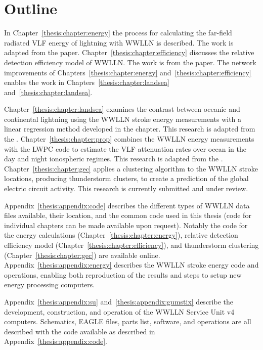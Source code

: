 \section{Outline}

In Chapter~\ref{thesis:chapter:energy} the process for calculating the far-field radiated VLF energy of lightning with WWLLN is described.
The work is adapted from the \citet{Hutchins2012} paper.
Chapter~\ref{thesis:chapter:efficiency} discusses the relative detection efficiency model of WWLLN.
The work is from the \citet{Hutchins2012a} paper.
The network improvements of Chapters~\ref{thesis:chapter:energy} and~\ref{thesis:chapter:efficiency} enables the work in Chapters~\ref{thesis:chapter:landsea} and~\ref{thesis:chapter:landsea}.

Chapter~\ref{thesis:chapter:landsea} examines the contrast between oceanic and continental lightning using the WWLLN stroke energy measurements with a linear regression method developed in the chapter.
This research is adapted from the \citet{Hutchins2013}.
Chapter~\ref{thesis:chapter:prop} combines the WWLLN energy measurements with the LWPC code to estimate the VLF attenuation rates over ocean in the day and night ionospheric regimes.
This research is adapted from the \citet{Hutchins2013a}.
Chapter~\ref{thesis:chapter:gec} applies a clustering algorithm to the WWLLN stroke locations, producing thunderstorm clusters, to create a prediction of the global electric circuit activity.
This research is currently submitted and under review.

Appendix~\ref{thesis:appendix:code} describes the different types of WWLLN data files available, their location, and the common code used in this thesis (code for individual chapters can be made available upon request).
Notably the code for the energy calculations (Chapter~\ref{thesis:chapter:energy}), relative detection efficiency model (Chapter~\ref{thesis:chapter:efficiency}), and thunderstorm clustering (Chapter~\ref{thesis:chapter:gec}) are available online.
Appendix~\ref{thesis:appendix:energy} describes the WWLLN stroke energy code and operations, enabling both reproduction of the results and steps to setup new energy processing computers.

Appendix~\ref{thesis:appendix:su} and~\ref{thesis:appendix:gumstix} describe the development, construction, and operation of the WWLLN Service Unit v4 computers.
Schematics, EAGLE files, parts list, software, and operations are all described with the code available as described in Appendix~\ref{thesis:appendix:code}.

